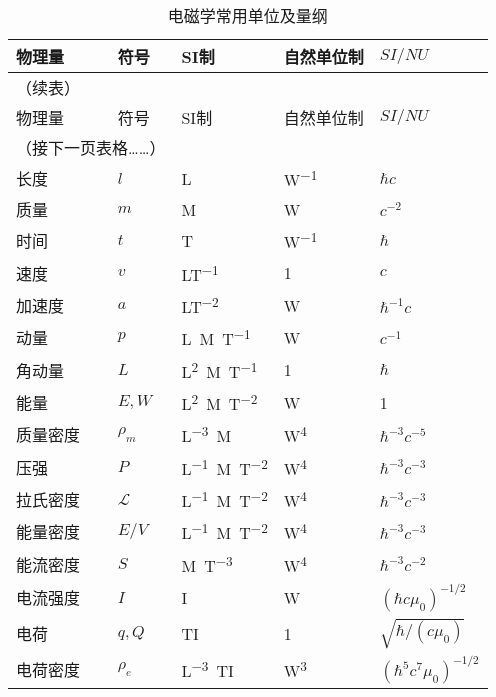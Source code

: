 \begin{longtable}{|*5{l|}}
    \caption{电磁学常用单位及量纲}  \label{chunit-dim:unitdimen}  \\    \hline
    物理量 & 符号   &   \si{SI}制   &   自然单位制 &  $SI/NU$  \\ \hline
    \endfirsthead
    \multicolumn{2}{l}{（续表）} \\ \hline
    物理量 & 符号   &   \si{SI}制   &   自然单位制 &  $SI/NU$ \\ \hline
    \endhead \hline
    \multicolumn{2}{c}{（接下一页表格……）} \\ [2ex]
    \endfoot
    \endlastfoot
    长度 & $l$ & \si{L} &  \si{W^{-1}} & $\hbar c$ \\
    质量 & $m$ & \si{M} &  \si{W^{}}   & $c^{-2}$ \\
    时间 & $t$ & \si{T} &  \si{W^{-1}} & $\hbar$ \\
    速度 & $v$ & \si{LT^{-1}}  & \si{1}& $c$ \\
    加速度 & $a$ & \si{LT^{-2}}  & \si{W^{}}& $\hbar^{-1} c$ \\
    动量 & $p$ & \si{L^{}M^{}T^{-1}}    & \si{W^{}} & $c^{-1}$ \\
    角动量 & $L$ & \si{L^{2}M^{}T^{-1}}   & \si{1}&  $\hbar$ \\
    能量 & $E,W$ & \si{L^{2}M^{}T^{-2}}   &  \si{W^{}} & \si{1} \\
    质量密度 & $\rho_m$ & \si{L^{-3}M^{}}     & \si{W^{4}}&  $\hbar^{-3}c^{-5}$  \\
    压强 & $P$ & \si{L^{-1}M^{}T^{-2}}     & \si{W^{4}}&  $\hbar^{-3}c^{-3}$ \\
    拉氏密度 & $\mathscr{L}$     &  \si{L^{-1}M^{}T^{-2}}      &   \si{W^4}&   $\hbar^{-3}c^{-3}$ \\
    能量密度 & $E/V$     &  \si{L^{-1}M^{}T^{-2}}      &   \si{W^4}&   $\hbar^{-3}c^{-3}$ \\
    能流密度 & $S$ & \si{M^{}T^{-3}}    & \si{W^{4}} & $\hbar^{-3}c^{-2}$ \\
    电流强度 & $I$     &   \si{I}        & \si{W^{}}  &$(\hbar c \mu_0)^{-1/2}$ \\
    电荷 & $q,Q$     &   \si{TI}        &  \si{1} & $\sqrt{\hbar/(c\mu_0)}$\\
    电荷密度 & $\rho_e$     &   \si{L^{-3}TI}      &   \si{W^{3}} & $(\hbar^5 c^7 \mu_0)^{-1/2}$ \\

\end{longtable}
